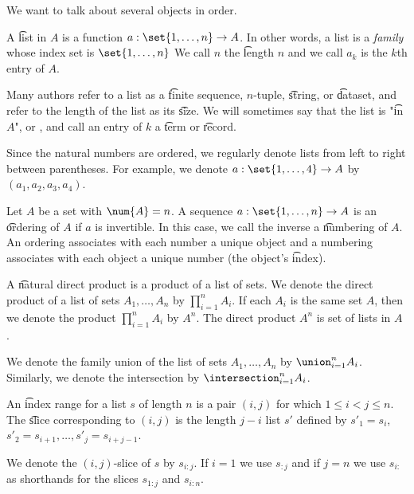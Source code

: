 
We want to talk about several objects in order.


A \t{list} in $A$ is a function $a: \set{1, \dots, n} \to A$.
In other words, a list is a \textit{family} whose index set is $\set{1, \dots, n}$
We call $n$ the \t{length} $n$ and we call $a_k$ is the \t{$k$th entry} of $A$.

Many authors refer to a list as a \t{finite sequence}, \t{$n$-tuple}, \t{string}, or \t{dataset}, and refer to the length of the list as its \t{size}.
We will sometimes say that the list is "\t{in} $A$", or , and call an entry of $k$ a \t{term} or \t{record}.


Since the natural numbers are ordered, we regularly denote lists from left to right between parentheses.
For example, we denote $a: \set{1, \dots, 4} \to A$ by $(a_1, a_2, a_3, a_4)$.

Let $A$ be a set with $\num{A} = n$.
A sequence $a: \set{1, \dots, n} \to A$ is an \t{ordering} of $A$ if $a$ is invertible.
In this case, we call the inverse a \t{numbering} of $A$.
An ordering associates with each number a unique object and a numbering associates with each object a unique number (the object's \t{index}).


A \t{natural direct product} is a product of a list of sets.
We denote the direct product of a list of sets $A_1, \dots, A_n$ by $\prod_{i = 1}^{n} A_i$.
If each $A_i$ is the same set $A$, then we denote the product $\prod_{i = 1}^{n} A_i$ by $A^n$.
The direct product $A^n$ is set of lists in $A$ .

We denote the family union of the list of sets $A_1, \dots, A_n$ by $\union_{i = 1}^{n} A_i$.
Similarly, we denote the intersection by $\intersection_{i = 1}^{n} A_i$.

An \t{index range} for a list $s$ of length $n$ is a pair $(i, j)$ for which $1 \leq i < j \leq n$.
The \t{slice} corresponding to $(i,j)$ is the length $j-i$ list $s'$ defined by $s'_1 = s_{i}$, $s'_2 = s_{i+1}, \dots, s'_{j} = s_{i + j-1}$.

We denote the $(i,j)$-slice of $s$ by $s_{i:j}$.
If $i = 1$ we use $s_{:j}$ and if $j = n$ we use $s_{i:}$ as shorthands for the slices $s_{1:j}$ and $s_{i:n}$.
